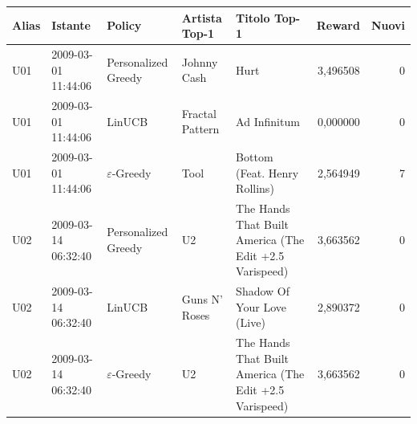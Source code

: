 \begin{tabular}{lll p{2cm}p{3cm}rr}
\toprule
Alias & Istante & Policy & Artista Top-1 & Titolo Top-1 & Reward & Nuovi \\
\midrule
U01 & 2009-03-01 11:44:06 & Personalized Greedy & Johnny Cash & Hurt & 3,496508 & 0 \\
U01 & 2009-03-01 11:44:06 & LinUCB & Fractal Pattern & Ad Infinitum & 0,000000 & 0 \\
U01 & 2009-03-01 11:44:06 & $\varepsilon$-Greedy & Tool & Bottom (Feat. Henry Rollins) & 2,564949 & 7 \\
U02 & 2009-03-14 06:32:40 & Personalized Greedy & U2 & The Hands That Built America (The Edit +2.5 Varispeed) & 3,663562 & 0 \\
U02 & 2009-03-14 06:32:40 & LinUCB & Guns N' Roses & Shadow Of Your Love (Live) & 2,890372 & 0 \\
U02 & 2009-03-14 06:32:40 & $\varepsilon$-Greedy & U2 & The Hands That Built America (The Edit +2.5 Varispeed) & 3,663562 & 0 \\
\bottomrule
\end{tabular}
